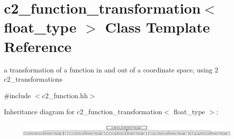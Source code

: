 \hypertarget{classc2__function__transformation}{\section{c2\-\_\-function\-\_\-transformation$<$ float\-\_\-type $>$ Class Template Reference}
\label{classc2__function__transformation}
}


a transformation of a function in and out of a coordinate space, using 2 c2\-\_\-transformations  




{\ttfamily \#include $<$c2\-\_\-function.\-hh$>$}

Inheritance diagram for c2\-\_\-function\-\_\-transformation$<$ float\-\_\-type $>$\-:\begin{figure}[H]
\begin{center}
\leavevmode
\includegraphics[height=0.715655cm]{classc2__function__transformation}
\end{center}
\end{figure}
